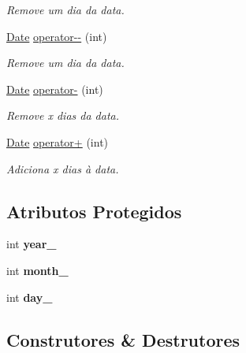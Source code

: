 \begin{DoxyCompactItemize}
\begin{DoxyCompactList}\small\item\em Remove um dia da data. \end{DoxyCompactList}\item 
\hyperlink{classDate}{Date} \hyperlink{classDate_ac2237a5f9f832bb521fe8f299a47db95}{operator-\/-\/} (int)
\begin{DoxyCompactList}\small\item\em Remove um dia da data. \end{DoxyCompactList}\item 
\hyperlink{classDate}{Date} \hyperlink{classDate_afed6ca708a5c8e9f201e760995002dd1}{operator-\/} (int)
\begin{DoxyCompactList}\small\item\em Remove x dias da data. \end{DoxyCompactList}\item 
\hyperlink{classDate}{Date} \hyperlink{classDate_a859a8d7af8cdbee73089732f59ab7492}{operator+} (int)
\begin{DoxyCompactList}\small\item\em Adiciona x dias à data. \end{DoxyCompactList}\end{DoxyCompactItemize}
\subsection*{Atributos Protegidos}
\begin{DoxyCompactItemize}
\item 
\mbox{\label{classDate_a000b73bb5ec170bcb9c55fe504ee1c3c}} 
int {\bfseries year\+\_\+}
\item 
\mbox{\label{classDate_ae70a5a5a937ab5ce563cac90e3d8fd4d}} 
int {\bfseries month\+\_\+}
\item 
\mbox{\label{classDate_a041a2fed5be6c658737622fa367af5e4}} 
int {\bfseries day\+\_\+}
\end{DoxyCompactItemize}


\subsection{Construtores \& Destrutores}
\mbox{\label{classDate_ad041535fef212285db248a489b7fe4ae}} 
